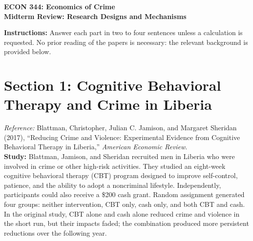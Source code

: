 \documentclass[12pt]{article}
\begin{document}
\begin{center}
\large\textbf{ECON 344: Economics of Crime \\ Midterm Review: Research Designs and Mechanisms}
\end{center}
\medskip
\noindent\textbf{Instructions:} Answer each part in two to four sentences unless a calculation is requested. No prior reading of the papers is necessary: the relevant background is provided below. 


\section*{Section 1: Cognitive Behavioral Therapy and Crime in Liberia}
\noindent \textit{Reference:} Blattman, Christopher, Julian C. Jamison, and Margaret Sheridan (2017), 
``Reducing Crime and Violence: Experimental Evidence from Cognitive Behavioral Therapy in Liberia,'' \emph{American Economic Review}.
\\
\noindent \textbf{Study:} Blattman, Jamison, and Sheridan recruited men in Liberia who were involved in crime or other high-risk activities.
They studied an eight-week cognitive behavioral therapy (CBT) program designed to improve self-control, patience, and the ability to adopt a noncriminal lifestyle.
Independently, participants could also receive a \$200 cash grant.
Random assignment generated four groups: neither intervention, CBT only, cash only, and both CBT and cash.
In the original study, CBT alone and cash alone reduced crime and violence in the short run, but their impacts faded;
the combination produced more persistent reductions over the following year.
\end{document}
